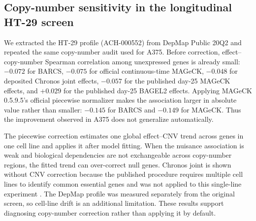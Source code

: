 \subsection{Copy-number sensitivity in the longitudinal HT-29 screen}

We extracted the HT-29 profile (ACH-000552) from DepMap Public 20Q2
\citep{depmap20q2} and repeated the same copy-number audit used for A375.
Before correction, effect--copy-number Spearman correlation among unexpressed
genes is already small: $-0.072$ for BARCS, $-0.075$ for official
continuous-time MAGeCK, $-0.048$ for deposited Chronos joint effects,
$-0.057$ for the published day-25 MAGeCK effects, and $+0.029$ for the
published day-25 BAGEL2 effects.  Applying MAGeCK 0.5.9.5's official piecewise
normalizer makes the association larger in absolute value rather than smaller:
$-0.145$ for BARCS and $-0.149$ for MAGeCK.  Thus the improvement observed in
A375 does not generalize automatically.

The piecewise correction estimates one global effect--CNV trend across genes
in one cell line and applies it after model fitting.  When the nuisance
association is weak and biological dependencies are not exchangeable across
copy-number regions, the fitted trend can over-correct null genes.  Chronos
joint is shown without CNV correction because the published procedure requires
multiple cell lines to identify common essential genes and was not applied to
this single-line experiment \citep{dempster2021chronos}.  The DepMap profile
was measured separately from the original screen, so cell-line drift is an
additional limitation.  These results support diagnosing copy-number
correction rather than applying it by default.
